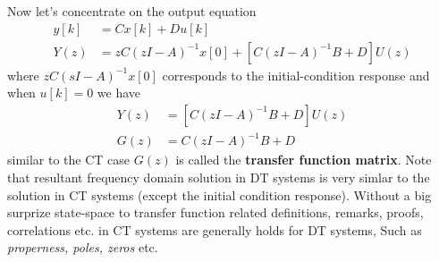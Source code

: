 \documentclass[twoside]{article}
\begin{document}
Now let's concentrate on the output equation
%
\begin{align*}
y[k] &= C x[k] + D u[k]
\\
Y(z) &= z C  \left( z I - A \right)^{-1} x[0] + \left[ C \left( z I - A \right)^{-1} B + D \right] U(z)
\end{align*}
%
where $z C  \left( s I - A \right)^{-1} x[0]$ corresponds to the initial-condition response and 
when $u[k]=0$ we have
%
\begin{align*}
Y(z) &=  \left[ C \left( z I - A \right)^{-1} B + D \right] U(z)
\\
G(z) &= C \left( z I - A \right)^{-1} B + D
\end{align*}
%
similar to the CT case $G(z)$ is called the \textbf{transfer function
  matrix}. Note that resultant frequency domain solution in DT systems
is very simlar to the solution in CT systems (except the initial
condition response). Without a big surprize state-space to transfer function related
definitions, remarks, proofs, correlations etc. in CT systems are
generally holds for DT systems, Such as \textit{properness, poles,
  zeros} etc.



\end{document}
